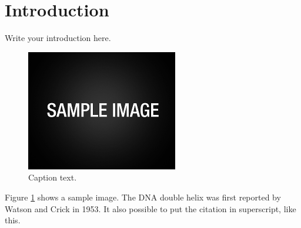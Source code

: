\section{Introduction}
Write your introduction here.

\begin{figure}[htb]
\begin{center}
\includegraphics[scale=0.7]{figures/image.png}
\caption{Caption text.}
\label{fig_sample-image}
\end{center}
\end{figure}

Figure  \ref{fig_sample-image} shows a sample image.
The DNA double helix was first reported by Watson and Crick in 1953.\cite{Watson1953} It also possible to put the citation in superscript, like this.
